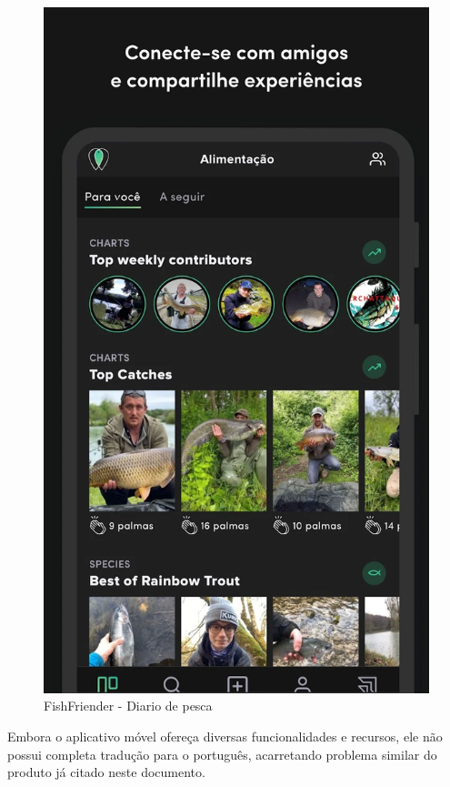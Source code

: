\begin{figure}[H]
    \centering
    \caption{FishFriender - Diario de pesca}
    \label{fig:fishFrienderApp}
    \includegraphics[scale=0.25]{./dados/figuras/fish-friender-app-feed}
\end{figure}

Embora o aplicativo móvel ofereça diversas funcionalidades e recursos, ele não possui completa tradução para o português, acarretando problema similar do produto já citado neste documento.

